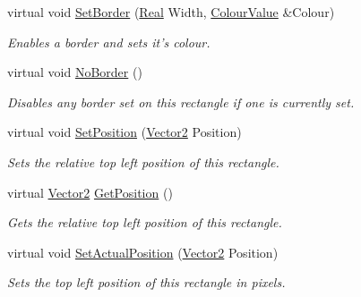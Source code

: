 \begin{DoxyCompactItemize}
virtual void \hyperlink{classphys_1_1UI_1_1Rectangle_a59903fec0c121da4b4fcdddc3e8488b4}{SetBorder} (\hyperlink{namespacephys_af7eb897198d265b8e868f45240230d5f}{Real} Width, \hyperlink{classphys_1_1ColourValue}{ColourValue} \&Colour)
\begin{DoxyCompactList}\small\item\em Enables a border and sets it's colour. \item\end{DoxyCompactList}\item 
\hypertarget{classphys_1_1UI_1_1Rectangle_aebeea2052a72be49eb9dece731022c78}{
virtual void \hyperlink{classphys_1_1UI_1_1Rectangle_aebeea2052a72be49eb9dece731022c78}{NoBorder} ()}
\label{d1/d5d/classphys_1_1UI_1_1Rectangle_aebeea2052a72be49eb9dece731022c78}

\begin{DoxyCompactList}\small\item\em Disables any border set on this rectangle if one is currently set. \item\end{DoxyCompactList}\item 
virtual void \hyperlink{classphys_1_1UI_1_1Rectangle_a264cb40ea238d5a4627add4cf55eb8c9}{SetPosition} (\hyperlink{classphys_1_1Vector2}{Vector2} Position)
\begin{DoxyCompactList}\small\item\em Sets the relative top left position of this rectangle. \item\end{DoxyCompactList}\item 
virtual \hyperlink{classphys_1_1Vector2}{Vector2} \hyperlink{classphys_1_1UI_1_1Rectangle_aa0e2d6170f0b2d5b1f915c705e7fca10}{GetPosition} ()
\begin{DoxyCompactList}\small\item\em Gets the relative top left position of this rectangle. \item\end{DoxyCompactList}\item 
virtual void \hyperlink{classphys_1_1UI_1_1Rectangle_a77fdf1fc5f2a2d73ccfb0ac0ff125ca5}{SetActualPosition} (\hyperlink{classphys_1_1Vector2}{Vector2} Position)
\begin{DoxyCompactList}\small\item\em Sets the top left position of this rectangle in pixels. \item\end{DoxyCompactList}\item 

\end{DoxyCompactItemize}

